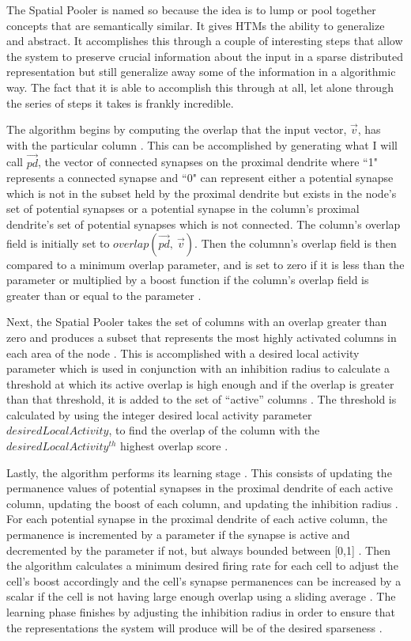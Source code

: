 \documentclass[oneside,12pt,openany]{book}
\begin{document}
	The Spatial Pooler is named so because the idea is to lump or pool together concepts that are semantically similar. It gives HTMs the ability to generalize and abstract. It accomplishes this through a couple of interesting steps that allow the system to preserve crucial information about the input in a sparse distributed representation but still generalize away some of the information in a algorithmic way. The fact that it is able to accomplish this through at all, let alone through the series of steps it takes is frankly incredible.
	
	The algorithm begins by computing the overlap that the input vector, $\overrightarrow{v}$, has with the particular column \cite{Whitepaper}. This can be accomplished by generating what I will call $\overrightarrow{pd}$, the vector of connected synapses on the proximal dendrite where ``1" represents a connected synapse and ``0" can represent either a potential synapse which is not in the subset held by the proximal dendrite but exists in the node's set of potential synapses or a potential synapse in the column's proximal dendrite's set of potential synapses which is not connected. The column's overlap field is initially set to $overlap(\overrightarrow{pd}, \ \overrightarrow{v})$. Then the columnn's overlap field is then compared to a minimum overlap parameter, and is set to zero if it is less than the parameter or multiplied by a boost function if the column's overlap field is greater than or equal to the parameter \cite{Whitepaper}.
	
	Next, the Spatial Pooler takes the set of columns with an overlap greater than zero and produces a subset that represents the most highly activated columns in each area of the node \cite{Principles}. This is accomplished with a desired local activity parameter which is used in conjunction with an inhibition radius to calculate a threshold at which its active overlap is high enough and if the overlap is greater than that threshold, it is added to the set of ``active'' columns \cite{Whitepaper}. The threshold is calculated by using the integer desired local activity parameter $desiredLocalActivity$, to find the overlap of the column with the $desiredLocalActivity^{th}$ highest overlap score \cite{Whitepaper}.
	
	Lastly, the algorithm performs its learning stage \cite{Whitepaper}. This consists of updating the permanence values of potential synapses in the proximal dendrite of each active column, updating the boost of each column, and updating the inhibition radius \cite{Whitepaper}. For each potential synapse in the proximal dendrite of each active column, the permanence is incremented by a parameter if the synapse is active and decremented by the parameter if not, but always bounded between [0,1] \cite{Whitepaper}. Then the algorithm calculates a minimum desired firing rate for each cell to adjust the cell's boost accordingly and the cell's synapse permanences can be increased by a scalar if the cell is not having large enough overlap using a sliding average \cite{Whitepaper}. The learning phase finishes by adjusting the inhibition radius in order to ensure that the representations the system will produce will be of the desired sparseness \cite{Whitepaper}.
	
\end{document}
